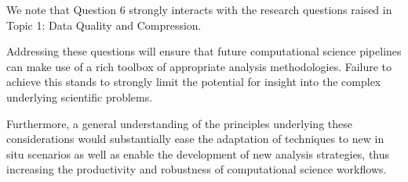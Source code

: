\begin{refsection}
\noindent
We note that Question 6 strongly interacts with the research questions raised in Topic 1: Data Quality and Compression.

Addressing these questions will ensure that future computational science pipelines can make use of a rich toolbox of appropriate analysis methodologies. Failure to achieve this stands to strongly limit the potential for insight into the complex underlying scientific problems.

Furthermore, a general understanding of the principles underlying these considerations would substantially ease the adaptation of techniques to new in situ scenarios as well as enable the development of new analysis strategies, thus increasing the productivity and robustness of computational science workflows.

\printbibliography
\end{refsection}


